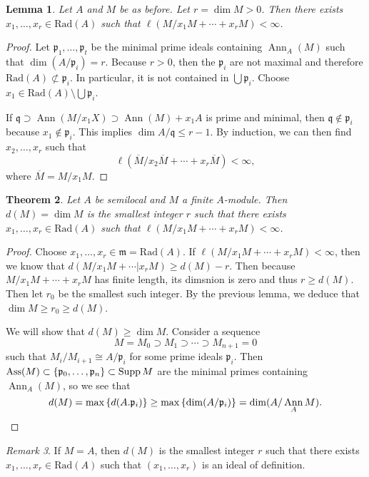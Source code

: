 \documentclass[leqno, openany]{memoir}
\newtheorem{thm}{Theorem}[section]
\newtheorem{lem}[thm]{Lemma}
\theoremstyle{definition}
\theoremstyle{remark}
\newtheorem{rmk}[thm]{Remark}
\theoremstyle{plain}
\theoremstyle{definition}
\theoremstyle{remark}
\newcommand{\mf}[1]{\mathfrak{#1}}
\newcommand{\mr}[1]{\mathrm{#1}}
\newcommand{\ol}[1]{\overline{#1}}
\DeclareMathOperator{\Ann}{Ann}
\DeclareMathOperator{\Ass}{Ass}
\begin{document}
\begin{lem}
    Let $A$ and $M$ be as before. Let $r = \dim M > 0$. Then there exists $x_1, \ldots, x_r \in \mr{Rad}(A)$ such that $\ell(M / x_1 M + \cdots + x_r M) < \infty$.
\end{lem}

\begin{proof}
    Let $\mf{p}_1, \ldots, \mf{p}_t$ be the minimal prime ideals containing $\Ann_A(M)$ such that $\dim(A/\mf{p}_i) = r$. Because $r > 0$, then the $\mf{p}_i$ are not maximal and therefore $\mr{Rad}(A) \not\subset \mf{p}_i$. In particular, it is not contained in $\bigcup \mf{p}_i$. Choose $x_1 \in \mr{Rad}(A) \setminus \bigcup \mf{p}_i$.

    If $\mf{q} \supset \Ann(M / x_1 X) \supset \Ann(M) + x_1A$ is prime and minimal, then $\mf{q} \notin \mf{p}_i$ because $x_1 \notin \mf{p}_i$. This implies $\dim A/\mf{q} \leq r-1$. By induction, we can then find $x_2, \ldots, x_r$ such that 
    \[ \ell(\ol{M} / x_2 \ol{M} + \cdots + x_r \ol{M}) < \infty, \]
    where $\ol{M} = M / x_1M$.
\end{proof}

\begin{thm}
    Let $A$ be semilocal and $M$ a finite $A$-module. Then $d(M) = \dim M$ is the smallest integer $r$ such that there exists $x_1, \ldots, x_r \in \mr{Rad}(A)$ such that $\ell(M / x_1 M + \cdots + x_r M) < \infty$.
\end{thm}

\begin{proof}
    Choose $x_1, \ldots, x_r \in \mf{m} = \mr{Rad}(A)$. If $\ell(M / x_1 M + \cdots + x_r M) < \infty$, then we know that $d(M / x_1 M + \cdots | x_r M) \geq d(M) - r$. Then because $M / x_1 M + \cdots + x_r M$ has finite length, its dimsnion is zero and thus $r \geq d(M)$. Then let $r_0$ be the smallest such integer. By the previous lemma, we deduce that $\dim M \geq r_0 \geq d(M)$.

    We will show that $d(M) \geq \dim M$. Consider a sequence 
    \[ M = M_0 \supset M_1 \supset \cdots \supset M_{n+1} = 0 \]
    such that $M_i / M_{i+1} \cong A / \mf{p}_i$ for some prime ideals $\mf{p}_i$. Then $\Ass(M) \subset \qty{ \mf{p}_0, \ldots, \mf{p}_n } \subset \operatorname{Supp} M$ are the minimal primes containing $\Ann_A(M)$, so we see that
    \[ d(M) = \max \qty{d ( A.\mf{p}_i )} \geq \max \qty{\dim (A / \mf{p}_i)} = \dim(A / \Ann_A M). \qedhere \]
\end{proof}

\begin{rmk}
    If $M = A$, then $d(M)$ is the smallest integer $r$ such that there exists $x_1, \ldots, x_r \in \mr{Rad}(A)$ such that $(x_1, \ldots, x_r)$ is an ideal of definition.
\end{rmk}
\end{document}
